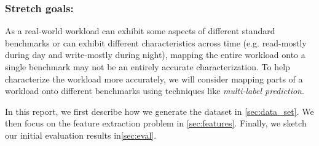 \subsubsection*{Stretch goals:}
As a real-world workload can exhibit some aspects of different standard
benchmarks or can exhibit different characteristics across time (e.g. read-mostly
during day and write-mostly during night), mapping the entire workload onto
a single benchmark may not be an entirely accurate characterization.
To help characterize the workload more accurately, we will consider mapping
parts of a workload onto different benchmarks using techniques like
\textit{multi-label prediction}.


In this report, we first describe how we generate the dataset in
\cref{sec:data_set}. We then focus on the feature extraction problem
in \cref{sec:features}.
Finally, we sketch our initial evaluation results in\cref{sec:eval}.
